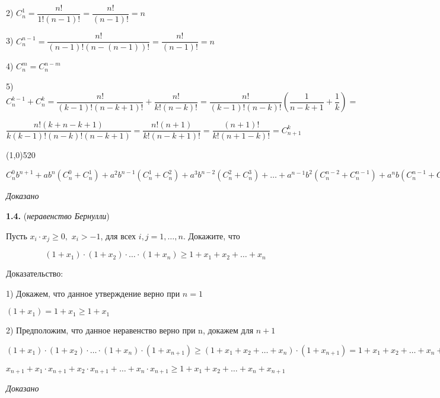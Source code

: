 \documentclass[12pt]{article}
\begin{document}
	2) $C_n^1 = \dfrac{n!}{1!(n-1)!} = \dfrac{n!}{(n-1)!} = n$
	
	3) $C_n^{n-1} = \dfrac{n!}{(n-1)!(n-(n-1))!} = \dfrac{n!}{(n-1)!} = n$\vspace{1mm}
	
	4) $C_n^m = C_n^{n-m}$\vspace{1mm}
	
	5) $C_n^{k-1}+C_n^k = \dfrac{n!}{(k-1)!(n-k+1)!} + \dfrac{n!}{k!(n-k)!} = \dfrac{n!}{(k-1)!(n-k)!}\left(\dfrac{1}{n-k+1}+\dfrac{1}{k}\right) = $
	
	$
	\dfrac{n!(k+n-k+1)}{k(k-1)!(n-k)!(n-k+1)} = \dfrac{n!(n+1)}{k!(n-k+1)!} = \dfrac{(n+1)!}{k!(n+1-k)!} = C_{n+1}^k
	$\vspace{2mm}
	
	\line(1,0){520}
	
	$   C_n^0b^{n+1}+ ab^n(C_n^0+C_n^1)+a^2b^{n-1}(C_n^1+C_n^2)+a^3b^{n-2}(C_n^2+C_n^3)+\dots+ a^{n-1}b^2(C_n^{n-2}+C_n^{n-1})+ a^nb(C_n^{n-1}+C_n^n) + C_n^na^{n+1} = C_{n+1}^0b^{n+1}+ ab^nC_{n+1}^1+\dots+a^{n-1}b^2C_{n+1}^{n-1}+ a^nbC_{n+1}^{n}+C_{n+1}^{n+1}a^{n+1} = \sum_{k=0}^{n+1}C_n^ka^kb^{n-k}
	$
	
	\vspace{2mm}
	{\it Доказано}\medskip
	
	{\bf 1.4.} ({\it неравенство Бернулли})
	
	Пусть $x_i\cdot x_j \ge 0,$ $x_i>-1$, для всех $i,j = 1,\dots, n$. Докажите, что
	
	\[
		(1+x_1)\cdot(1+x_2)\cdot\dots\cdot(1+x_n) \ge 1+x_1+x_2+\dots+x_n
	\]
	
	\hspace{-2mm} Доказательство:
	\vspace{1mm}
	
	1) Докажем, что данное утверждение верно при $n=1$
	
	\quad$
		(1+x_1) = 1+x_1 \ge 1+x_1
	$
	
	2) Предположим, что данное неравенство верно при n, докажем для $n+1$
	\vspace{2mm}
	
	$
	(1+x_1)\cdot(1+x_2)\cdot\dots\cdot(1+x_n)\cdot(1+x_{n+1}) \ge (1+x_1+x_2+\dots+x_n)\cdot(1+x_{n+1}) = 1+x_1+x_2+\dots+x_n+
	$
	
	$
		x_{n+1}+x_1\cdot x_{n+1}+x_2\cdot x_{n+1}+\dots+ x_n\cdot x_{n+1} \ge 1+x_1+x_2+\dots+x_n+x_{n+1}
	$
	
	\vspace{2mm}
	
	{\it Доказано}
	\medskip
	
\end{document}
